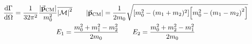 \begin{gather*}
        \dv{\Gamma}{\Omega} = \frac{1}{32\pi^2}\frac{\abs{\va{p}_{\mathrm{CM}}}}{m_0^2}\overline{\abs{\operatorname{\mathcal{M}}}^2}
        \qquad
        \abs{\va{p}_{\mathrm{CM}}} = \frac{1}{2m_0}\sqrt{\qty[m_0^2 - (m_1+m_2)^2]\qty[m_0^2 - \qty(m_1-m_2)^2]}
        \\
        E_1 = \frac{m_0^2 + m_1^2 - m_2^2}{2m_0}
        \qquad
        E_2 = \frac{m_0^2 + m_2^2 - m_1^2}{2m_0}
\end{gather*}
